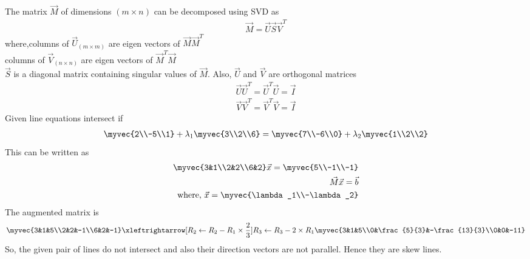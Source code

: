 

%
The matrix $\vec{M}$ of dimensions $(m \times n)$ can be decomposed using SVD as 
\begin{align}
\vec{M}=\vec{U}\vec{S}\vec{V}^T\label{eq:solutions/3/4/1}
\end{align}
where,columns of $\vec{U}_{(m \times m)}$ are eigen vectors of $\vec{M}\vec{M}^T$\\
columns of $\vec{V}_{(n \times n)}$ are eigen vectors of $\vec{M}^T\vec{M}$\\
$\vec{S}$ is a diagonal matrix containing singular values of $\vec{M}$. Also, $\vec{U}$ and $\vec{V}$ are orthogonal matrices
\begin{align}
    \vec{U}\vec{U}^T=\vec{U}^T\vec{U}=\vec{I}\\
     \vec{V}\vec{V}^T=\vec{V}^T\vec{V}=\vec{I}
\end{align}
Given line equations intersect if
\begin{align}
 \myvec{2\\-5\\1}+\lambda_1\myvec{3\\2\\6}=\myvec{7\\-6\\0}+\lambda_2\myvec{1\\2\\2}
\end{align}
This can be written as 
\begin{align}
    \myvec{3&1\\2&2\\6&2}\vec{x}=\myvec{5\\-1\\-1}\\
    \vec{M}\vec{x}=\vec{b}\\
    \text{where, }\vec{x}=\myvec{\lambda_1\\-\lambda_2}
\end{align}
The augmented matrix is 
\begin{align}
    \myvec{3&1&5\\2&2&-1\\6&2&-1}\xleftrightarrow[R_2\leftarrow R_2-R_1\times \frac{2}{3}]{R_3\leftarrow R_3-2\times R_1}\myvec{3&1&5\\0&\frac{5}{3}&-\frac{13}{3}\\0&0&-11}
\end{align}
So, the given pair of lines do not intersect and also their direction vectors are not parallel. Hence they are skew lines.\\

